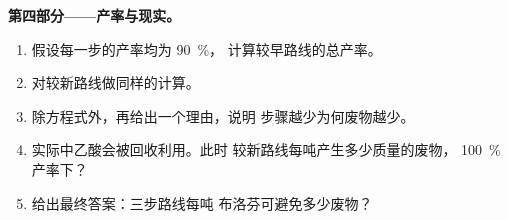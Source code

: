 \begin{problem}
\medskip
\noindent\textbf{第四部分——产率与现实。}
\begin{enumerate}[resume]
  \item 假设每一步的产率均为 \qty{90}{\percent}，
        计算较早路线的总产率。
  \item 对较新路线做同样的计算。
  \item 除方程式外，再给出一个理由，说明
        步骤越少为何废物越少。
  \item 实际中乙酸会被回收利用。此时
        较新路线每吨产生多少质量的废物，
        \qty{100}{\percent} 产率下？
  \item 给出最终答案：三步路线每吨
        布洛芬可避免多少废物？
\end{enumerate}
\end{problem}

